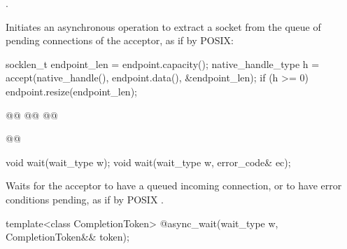 \begin{itemdescr}
\addedpnum
{}

\pnum
\completionsig {}.

\pnum
\effects Initiates an asynchronous operation to extract a socket from the queue of pending connections of the acceptor, as if by POSIX:
\begin{codeblock}
socklen_t endpoint_len = endpoint.capacity();
native_handle_type h = accept(native_handle(),
                              endpoint.data(),
                              &endpoint_len);
if (h >= 0)
  endpoint.resize(endpoint_len);
\end{codeblock}
\end{itemdescr}

\begin{itemdecl}
@@
@@
@@
\end{itemdecl}

\begin{itemdescr}
\addedpnum
\added{\returns}
\begin{codeblock}
@@
\end{codeblock}
\end{itemdescr}

\begin{itemdecl}
void wait(wait_type w);
void wait(wait_type w, error_code& ec);
\end{itemdecl}

\begin{itemdescr}
\pnum
\effects Waits for the acceptor to have a queued incoming connection, or to have error conditions pending, as if by POSIX .
\end{itemdescr}

\begin{itemdecl}
template<class CompletionToken>
  @\DEDUCED@ async_wait(wait_type w, CompletionToken&& token);
\end{itemdecl}

